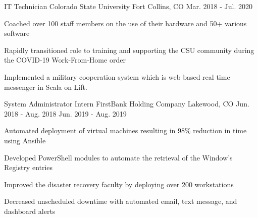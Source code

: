 \begin{cventries}
  \cventry
    {IT Technician} %
    {Colorado State University} %
    {Fort Collins, CO} %
    {Mar. 2018 - Jul. 2020} %
    {
      \begin{cvitems} %
        \item {Coached over 100 staff members on the use of their hardware and 50+ various software}
        \item {Rapidly transitioned role to training and supporting the CSU community during the COVID-19 Work-From-Home order}
        \item {Implemented a military cooperation system which is web based real time messenger in Scala on Lift.}
      \end{cvitems}
    }

  \twodates
    {System Administrator Intern} %
    {FirstBank Holding Company} %
    {Lakewood, CO} %
    {Jun. 2018 - Aug. 2018} %
    {Jun. 2019 - Aug. 2019}
    {
      \begin{cvitems} %
        \item {Automated deployment of virtual machines resulting in 98\% reduction in time using Ansible}
        \item {Developed PowerShell modules to automate the retrieval of the Window’s Registry entries}
        \item {Improved the disaster recovery faculty by deploying over 200 workstations}
        \item {Decreased unscheduled downtime with automated email, text message, and dashboard alerts}
      \end{cvitems}
    }
    

\end{cventries}
